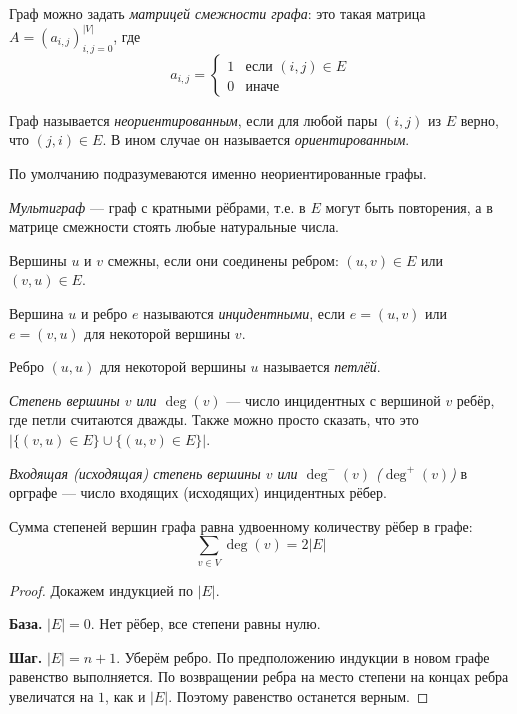 \documentclass[12pt,a4paper]{article}
\begin{document}
    \begin{definition}
        Граф можно задать \emph{матрицей смежности графа}: это такая матрица $A = (a_{i, j})_{i, j=0}^{|V|}$, где
        \[
            a_{i,j} = \begin{cases}
                1& \text{если $(i, j) \in E$}\\
                0& \text{иначе}
            \end{cases}
        \]
    \end{definition}

    \begin{definition}
        Граф называется \emph{неориентированным}, если для любой пары $(i, j)$ из $E$ верно, что $(j, i) \in E$. В ином случае он называется \emph{ориентированным}.

        По умолчанию подразумеваются именно неориентированные графы.
    \end{definition}

    \begin{definition}
        \emph{Мультиграф} --- граф с кратными рёбрами, т.е. в $E$ могут быть повторения, а в матрице смежности стоять любые натуральные числа.
    \end{definition}

    \begin{definition}
        Вершины $u$ и $v$ смежны, если они соединены ребром: $(u, v) \in E$ или $(v, u) \in E$.

        Вершина $u$ и ребро $e$ называются \emph{инцидентными}, если $e = (u, v)$ или $e = (v, u)$ для некоторой вершины $v$.

        Ребро $(u, u)$ для некоторой вершины $u$ называется \emph{петлёй}.

        \emph{Степень вершины $v$ или $\deg(v)$} --- число инцидентных с вершиной $v$ ребёр, где петли считаются дважды. Также можно просто сказать, что это $|\{(v, u) \in E\} \cup \{(u, v) \in E\}|$.

        \emph{Входящая (исходящая) степень вершины $v$ или $\deg^-(v)$ ($\deg^+(v)$)} в орграфе --- число входящих (исходящих) инцидентных рёбер.
    \end{definition}

    \begin{lemma}
        Сумма степеней вершин графа равна удвоенному количеству рёбер в графе:
        \[
            \sum_{v \in V} \deg(v) = 2 |E|
        \]
    \end{lemma}

    \begin{proof}
        Докажем индукцией по $|E|$.

        \textbf{База.} $|E| = 0$. Нет рёбер, все степени равны нулю.

        \textbf{Шаг.} $|E| = n+1$. Уберём ребро. По предположению индукции в новом графе равенство выполняется. По возвращении ребра на место степени на концах ребра увеличатся на $1$, как и $|E|$. Поэтому равенство останется верным.
    \end{proof}
\end{document}
